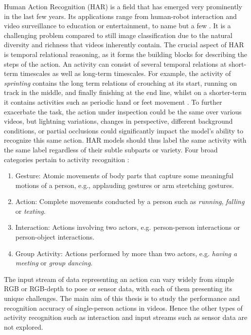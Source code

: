 \documentclass[extern,palatino]{cgMA}
\begin{document}
Human Action Recognition (HAR) is a field that has emerged very prominently in the last few years. Its applications range from human-robot interaction and video surveillance to education or entertainment, to name but a few \cite{pareek2021survey}. It is a challenging problem compared to still image classification due to the natural diversity and richness that videos inherently contain. The crucial aspect of HAR is temporal relational reasoning, as it forms the building blocks for describing the steps of the action. An activity can consist of several temporal relations at short-term timescales as well as long-term timescales. For example, the activity of \textit{sprinting} contains the long term relations of crouching at its start, running on track in the middle, and finally finishing at the end line, whilst on a shorter-term it contains activities such as periodic hand or feet movement \cite{zhou2018temporal}. To further exacerbate the task, the action under inspection could be the same over various videos, but lightning variations, changes in perspective, different background conditions, or partial occlusions could significantly impact the model’s ability to recognize this same action. HAR models should thus label the same activity with the same label regardless of their subtle subparts or variety. Four broad categories pertain to activity recognition \cite{aggarwal2011human}:

\begin{enumerate}
\item Gesture: Atomic movements of body parts that capture some meaningful motions of a person, e.g., applauding gestures or arm stretching gestures.
\item Action: Complete movements conducted by a person such as \textit{running}, \textit{falling} or \textit{texting}.
\item Interaction: Actions involving two actors, e.g. person-person interactions or person-object interactions.
\item Group Activity: Actions performed by more than two actors, e.g. \textit{having a meeting} or \textit{group dancing}.
\end{enumerate}

The input stream of data representing an action can vary widely from simple RGB or RGB-depth to pose or sensor data, with each of them presenting its unique challenges. The main aim of this thesis is to study the performance and recognition accuracy of single-person actions in videos. Hence the other types of activity recognition such as interaction and input streams such as sensor data are not explored. 
\end{document}
